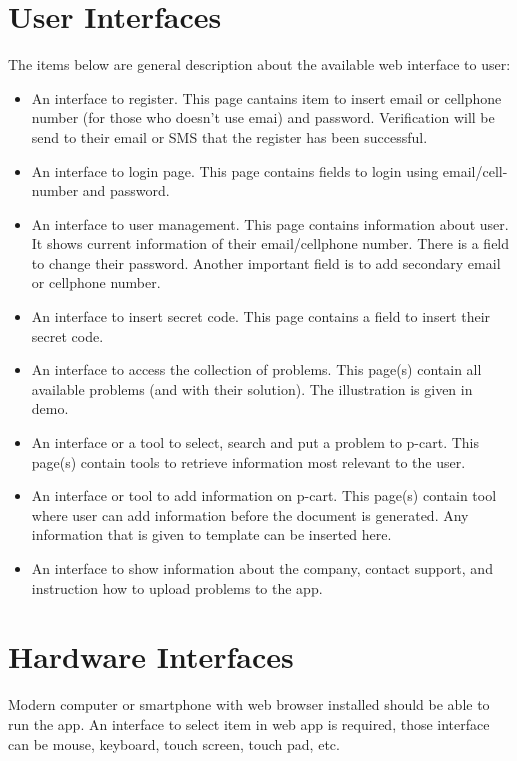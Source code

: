 \documentclass{scrreprt}
\begin{document}
\section{User Interfaces}
The items below are general description about the available web interface to user:
\begin{itemize}
    \item An interface to register.
        This page cantains item to insert email or cellphone number (for those who doesn't use emai) and password. Verification will be send to their email or SMS that the register has been successful.
    \item An interface to login page.
        This page contains fields to login using email/cell-number and password.
    \item An interface to user management.
        This page contains information about user. It shows current information of their email/cellphone number. There is a field to change their password. Another important field is to add secondary email or cellphone number.
    \item An interface to insert secret code.
        This page contains a field to insert their secret code. 
    \item An interface to access the collection of problems.
        This page(s) contain all available problems (and with their solution). The illustration is given in demo. 
    \item An interface or a tool to select, search and put a problem to p-cart. 
        This page(s) contain tools to retrieve information most relevant to the user. 
    \item An interface or tool to add information on p-cart.
        This page(s) contain tool where user can add information before the document is generated. Any information that is given to template can be inserted here.  
    \item An interface to show information about the company, contact support, and instruction how to upload problems to the app.
\end{itemize}

\section{Hardware Interfaces}
Modern computer or smartphone with web browser installed should be able to run the app. An interface to select item in web app is required, those interface can be mouse, keyboard, touch screen, touch pad, etc.  
\end{document}
